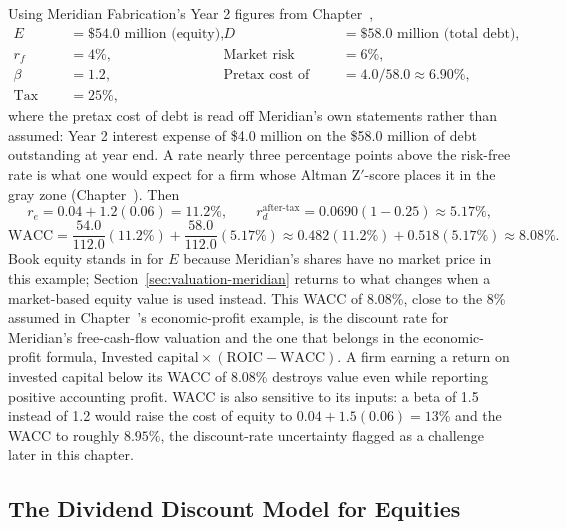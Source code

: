 \documentclass[../ai_in_finance]{subfiles}
\begin{document}
Using Meridian Fabrication's Year 2 figures from Chapter~,
\begin{align*}
E &= \$54.0 \text{ million (equity)}, & D &= \$58.0 \text{ million (total debt)}, \\
r_f &= 4\%, & \text{Market risk premium} &= 6\%, \\
\beta &= 1.2, & \text{Pretax cost of debt} &= 4.0/58.0 \approx 6.90\%, \\
\text{Tax rate} &= 25\%, & &
\end{align*}
where the pretax cost of debt is read off Meridian's own statements rather than assumed: Year 2 interest expense of \$4.0 million on the \$58.0 million of debt outstanding at year end. A rate nearly three percentage points above the risk-free rate is what one would expect for a firm whose Altman Z$'$-score places it in the gray zone (Chapter~). Then
\begin{equation*}
r_e = 0.04 + 1.2(0.06) = 11.2\%, \qquad r_d^{\text{after-tax}} = 0.0690(1-0.25) \approx 5.17\%,
\end{equation*}
\begin{equation*}
\text{WACC} = \frac{54.0}{112.0}(11.2\%) + \frac{58.0}{112.0}(5.17\%) \approx 0.482(11.2\%) + 0.518(5.17\%) \approx 8.08\%.
\end{equation*}
Book equity stands in for $E$ because Meridian's shares have no market price in this example; Section~\ref{sec:valuation-meridian} returns to what changes when a market-based equity value is used instead. This WACC of 8.08\%, close to the 8\% assumed in Chapter~'s economic-profit example, is the discount rate for Meridian's free-cash-flow valuation and the one that belongs in the economic-profit formula, $\text{Invested capital} \times (\text{ROIC} - \text{WACC})$. A firm earning a return on invested capital below its WACC of 8.08\% destroys value even while reporting positive accounting profit. WACC is also sensitive to its inputs: a beta of 1.5 instead of 1.2 would raise the cost of equity to $0.04+1.5(0.06)=13\%$ and the WACC to roughly $8.95\%$, the discount-rate uncertainty flagged as a challenge later in this chapter.

\subsection{The Dividend Discount Model for Equities}
\label{sec:valuation-ddm}
\end{document}
